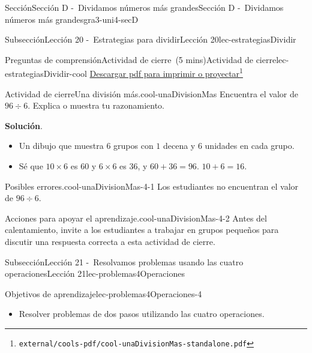 \documentclass[oneside,10pt,]{article}
\newcommand{\blocktitlefont}{\relax}
\begin{document}
\begin{sectionptx}{Sección}{Sección D -~Dividamos números más grandes}{}{Sección D -~Dividamos números más grandes}{}{}{gra3-uni4-secD}
\begin{subsectionptx}{Subsección}{Lección 20 -~Estrategias para dividir}{}{Lección 20}{}{}{lec-estrategiasDividir}
\begin{reading-questions-subsubsection}{Preguntas de comprensión}{Actividad de cierre~(5 mins)}{}{Actividad de cierre}{}{}{lec-estrategiasDividir-cool}
\href{external/cools-pdf/cool-unaDivisionMas-standalone.pdf}{Descargar pdf para imprimir o proyectar}\footnote{\nolinkurl{external/cools-pdf/cool-unaDivisionMas-standalone.pdf}\label{lec-estrategiasDividir-cool-5}}\begin{project}{Actividad de cierre}{Una división más.}{cool-unaDivisionMas}%
Encuentra el valor de \(96 \div 6\). Explica o muestra tu razonamiento.%
\par\smallskip%
\noindent\textbf{\blocktitlefont Solución}.\hypertarget{cool-unaDivisionMas-3}{}\quad{}%
\begin{itemize}[label=\textbullet]
\item{}Un dibujo que muestra \(6\) grupos con \(1\) decena y \(6\) unidades en cada grupo.%
\item{}Sé que \(10\times6\) es \(60\) y \(6\times6\) es \(36\), y \(60 + 36 = 96\). \(10 + 6=16\).%
\end{itemize}
\end{project}%
\par
\begin{paragraphs}{Posibles errores.}{cool-unaDivisionMas-4-1}%
Los estudiantes no encuentran el valor de \(96 \div 6\).%
\end{paragraphs}%
\begin{paragraphs}{Acciones para apoyar el aprendizaje.}{cool-unaDivisionMas-4-2}%
Antes del calentamiento, invite a los estudiantes a trabajar en grupos pequeños para discutir una respuesta correcta a esta actividad de cierre.%
\end{paragraphs}%
\end{reading-questions-subsubsection}
\end{subsectionptx}
%
%
\typeout{************************************************}
\typeout{************************************************}
%
\begin{subsectionptx}{Subsección}{Lección 21 -~Resolvamos problemas usando las cuatro operaciones}{}{Lección 21}{}{}{lec-problemas4Operaciones}
\begin{objectives}{Objetivos de aprendizaje}{lec-problemas4Operaciones-4}
%
\begin{itemize}[label=\textbullet]
\item{}Resolver problemas de dos pasos utilizando las cuatro operaciones.%
\end{itemize}
\end{objectives}
\begin{introduction}{}%

\end{introduction}
\end{subsectionptx}
\end{sectionptx}
\end{document}

